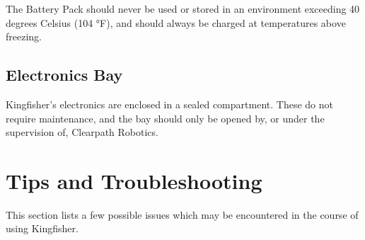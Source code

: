 \documentclass[]{clearpath-latex/clearpath-manual}
\begin{document}
The Battery Pack should never be used or stored in an environment exceeding 40 degrees Celsius (104 °F), and should always be charged at temperatures above freezing.

\subsection{Electronics Bay}
Kingfisher's electronics are enclosed in a sealed compartment. These do not require maintenance, and the bay should only be opened by, or under the supervision of, Clearpath Robotics.

\newpage

\section{Tips and Troubleshooting}
This section lists a few possible issues which may be encountered in the course of using Kingfisher.
\end{document}
